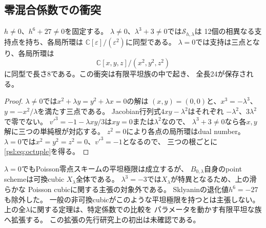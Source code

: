 \subsection{零混合係数での衝突}

\begin{corollary}
\label{psl:cor:collision}
$h\ne0$、$h^6+27\ne0$を固定する。
$\lambda\ne0$、$\lambda^3+3\ne0$では$\mathcal S_{h,\lambda}$は
12個の相異なる支持点を持ち、各局所環は
$\mathbb C[\varepsilon]/(\varepsilon^2)$に同型である。
$\lambda=0$では支持は三点となり、各局所環は
\[
 \boxed{\mathbb C[x,y,z]/(x^2,y^2,z^2)}
 \tag{PL8}\label{psl:eq:octuple}
\]
に同型で長さ8である。この衝突は有限平坦族の中で起き、
全長24が保存される。
\end{corollary}
\begin{proof}
$\lambda\ne0$では$x^2+\lambda y=y^2+\lambda x=0$の解は
$(x,y)=(0,0)$と、$x^3=-\lambda^3$、$y=-x^2/\lambda$を満たす三点である。
Jacobian行列式$4xy-\lambda^2$はそれぞれ
$-\lambda^2$、$3\lambda^2$で零でない。
$v'^3=-1-\lambda xy/3$は$xy=0$または$\lambda^2$なので、
$\lambda^3+3\ne0$なら各$x,y$解に三つの単純根が対応する。
$z^2=0$により各点の局所環はdual number。
$\lambda=0$では$x^2=y^2=z^2=0$、$v'^3=-1$となるので、
三つの根ごとに\eqref{psl:eq:octuple}を得る。
\end{proof}

\begin{remark}[特殊化と新規性の範囲]
\label{psl:rem:scope}
$\lambda=0$でもPoisson零点スキームの平坦極限は成立するが、
$B_{0,\lambda}$自身のpoint schemeは可換cubic $X_\lambda$全体である。
$\lambda^3=-3$では$X_\lambda$が特異となるため、上の滑らかな
Poisson cubicに関する主張の対象外である。
Sklyaninの退化値$h^6=-27$も除外した。
一般の非可換cubicがこのような平坦極限を持つとは主張しない。
上の全$\lambda$に関する定理は、特定係数での比較を
パラメータを動かす有限平坦な族へ拡張する。
この拡張の先行研究上の初出は未確認である。
\end{remark}
